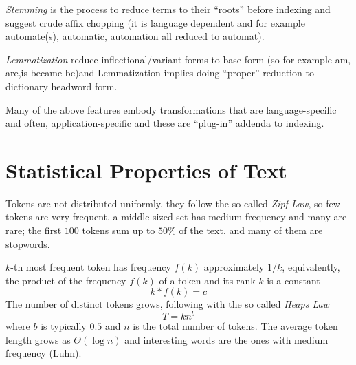 \emph{Stemming} is the process to reduce terms to their “roots” before indexing and
suggest crude affix chopping (it is language dependent and for example 
automate(s), automatic, automation all reduced to automat).

\emph{Lemmatization} reduce inflectional/variant forms to base form (so for example
am, are,is became be)and Lemmatization implies doing “proper” reduction to 
dictionary headword form.

Many of the above features embody transformations that are language-specific and
often, application-specific and these are “plug-in” addenda to indexing.

\section{Statistical Properties of Text}
Tokens are not distributed uniformly, they follow the so called \emph{Zipf Law},
so few tokens are very frequent, a middle sized set has medium frequency and 
many are rare; the first $100$ tokens sum up to $50\%$ of the text,
and many of them are stopwords.

$k$-th most frequent token has frequency $f(k)$ approximately $1/k$, equivalently,
the product of the frequency $f(k)$ of a token and its rank $k$ is a constant
\[ k * f(k) = c \]
The number of distinct tokens grows, following with the so called \emph{Heaps Law}
\[ T = kn^b\]
where $b$ is typically $0.5$ and $n$ is the total number of tokens.\newline
The average token length grows as $\Theta(\log n)$ and interesting words 
are the ones with medium frequency (Luhn).

